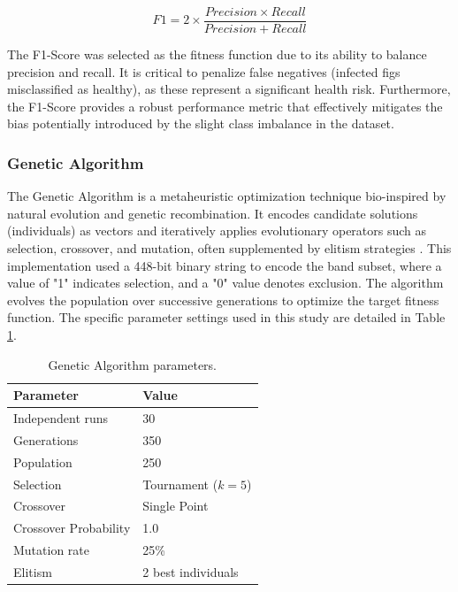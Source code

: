 \documentclass[runningheads]{llncs}
\begin{document}
\begin{equation} \label{eq:f1_score}
    F1=2\times{\frac{Precision \times{Recall}}{Precision + Recall}}
\end{equation}


The F1-Score was selected as the fitness function due to its ability to balance precision and recall. 
It is critical to penalize false negatives (infected figs misclassified as healthy), as these represent a significant health risk. 
Furthermore, the F1-Score provides a robust performance metric that effectively mitigates the bias potentially introduced by the slight class imbalance in the dataset.

\subsubsection{Genetic Algorithm}
The Genetic Algorithm is a metaheuristic optimization technique bio-inspired by natural evolution and genetic recombination. 
It encodes candidate solutions (individuals) as vectors and iteratively applies evolutionary operators such as selection, crossover, and mutation, often supplemented by elitism strategies \cite{eiben_introduction_2015, deb_multi-objective_2001}. 
This implementation used a 448-bit binary string to encode the band subset, where a value of "1" indicates selection, and a "0" value denotes exclusion.
The algorithm evolves the population over successive generations to optimize the target fitness function. 
The specific parameter settings used in this study are detailed in Table \ref{tab1}.

\begin{table}
    \caption{Genetic Algorithm parameters.\label{tab1}}
    \centering
    \begin{tabular}{ll}
        \hline
        {\bfseries Parameter} & {\bfseries Value}\\
        \hline
        Independent runs & 30 \\
        Generations & 350\\
        Population & 250\\
        Selection & Tournament ($k=5$) \\
        Crossover & Single Point \\
        Crossover Probability & 1.0\\
        Mutation rate & 25\%\\
        Elitism & 2 best individuals\\
        \hline
    \end{tabular}
\end{table}
\end{document}
